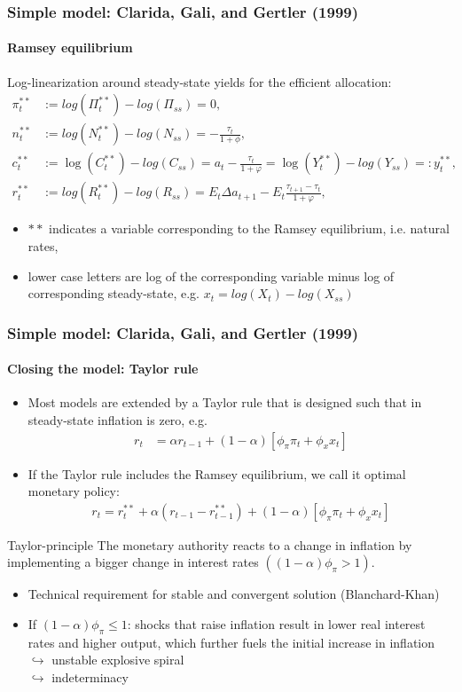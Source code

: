\documentclass[handout]{beamer}  %
\begin{document}
\begin{frame}\frametitle{Simple model: Clarida, Gali, and Gertler (1999)}\framesubtitle{Ramsey equilibrium}
Log-linearization around steady-state yields for the efficient allocation:\footnotesize
\begin{align*}
\pi_t^{**} &:= log(\Pi_t^{**})-log(\Pi_{ss}) = 0,\\
n^{**}_t &:= log(N_t^{**})-log(N_{ss}) = -\frac{\tau_t}{1+\phi},\\
c^{**}_t &:= \log ( C_{t}^{**}) -log(C_{ss}) =a_{t}-\frac{\tau _{t}}{1+\varphi } = \log( Y_{t}^{**})-log(Y_{ss}) =: y^{**}_t,\\
r_t^{**} &:= log(R_t^{**}) - log(R_{ss}) = E_{t}\Delta a_{t+1}-E_{t}\frac{\tau _{t+1}-\tau _{t}}{1+\varphi },
\end{align*}\normalsize
\begin{itemize}
  \item $\ast\ast $ indicates a variable corresponding to the Ramsey equilibrium, i.e. natural rates,
  \item lower case letters are log of the corresponding variable minus log of corresponding steady-state, e.g. $x_t = log(X_t) - log(X_{ss})$
\end{itemize}
\end{frame}

\begin{frame}\frametitle{Simple model: Clarida, Gali, and Gertler (1999)}\framesubtitle{Closing the model: Taylor rule}\footnotesize
\begin{itemize}
\item Most models are extended by a Taylor rule that is designed such that in steady-state inflation is zero, e.g.
\begin{align*}
  r_{t} &=\alpha r_{t-1}+(1-\alpha )\left[ \phi _{\pi }\pi _{t}+\phi _{x}x_{t}\right]
\end{align*}
\item If the Taylor rule includes the Ramsey equilibrium, we call it optimal monetary policy:
\begin{align*}
  r_{t} = r_t^{**} + \alpha (r_{t-1}-r^{**}_{t-1})+(1-\alpha )\left[ \phi _{\pi }\pi _{t}+\phi _{x}x_{t}\right]
\end{align*}
\end{itemize}
\begin{block}{Taylor-principle}
The monetary authority reacts to a change in inflation by implementing a bigger change in interest rates $((1-\alpha) \phi_\pi>1)$.
\end{block}
\begin{itemize}
  \item Technical requirement for stable and convergent solution (Blanchard-Khan)
  \item If $(1-\alpha) \phi_\pi \leq 1$: shocks that raise inflation result in lower real interest rates and higher output, which further fuels the initial increase in inflation \\
  $\hookrightarrow$ unstable explosive spiral\\
  $\hookrightarrow$ indeterminacy
\end{itemize}
\end{frame}
\end{document}

